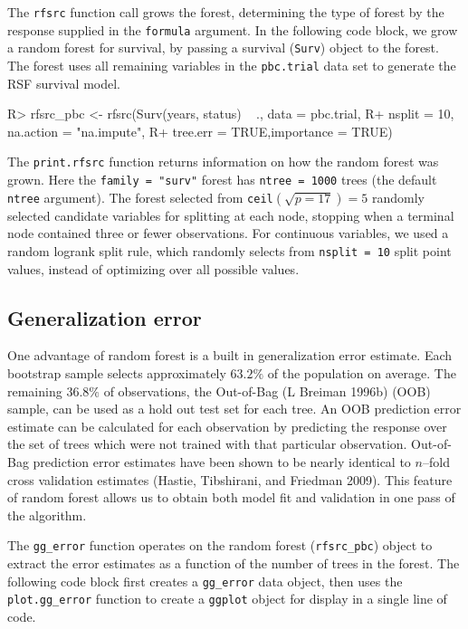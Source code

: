 \documentclass[article, nojss]{jss}
\begin{document}
The  \texttt{rfsrc} function call grows the forest,
determining the type of forest by the response supplied in the
\texttt{formula} argument. In the following code block, we grow a random
forest for survival, by passing a survival (\texttt{Surv}) object to the
forest. The forest uses all remaining variables in the
\texttt{pbc.trial} data set to generate the RSF survival model.

\begin{Schunk}
\begin{Sinput}
R> rfsrc_pbc <- rfsrc(Surv(years, status) ~ ., data = pbc.trial,
R+                    nsplit = 10, na.action = "na.impute",
R+                    tree.err = TRUE,importance = TRUE)
\end{Sinput}
\end{Schunk}

The \texttt{print.rfsrc} function returns information on how the random
forest was grown. Here the \texttt{family\ =\ "surv"} forest has
\texttt{ntree\ =\ 1000} trees (the default \texttt{ntree} argument). The
forest selected from \texttt{ceil}\((\sqrt{p=17}) = 5\) randomly
selected candidate variables for splitting at each node, stopping when a
terminal node contained three or fewer observations. For continuous
variables, we used a random logrank split rule, which randomly selects
from \texttt{nsplit\ =\ 10} split point values, instead of optimizing
over all possible values.

\subsection{Generalization error}\label{generalization-error}

One advantage of random forest is a built in generalization error
estimate. Each bootstrap sample selects approximately \(63.2\%\) of the
population on average. The remaining \(36.8\%\) of observations, the
Out-of-Bag (L Breiman 1996b) (OOB) sample, can be used as a hold out
test set for each tree. An OOB prediction error estimate can be
calculated for each observation by predicting the response over the set
of trees which were not trained with that particular observation.
Out-of-Bag prediction error estimates have been shown to be nearly
identical to \(n\)--fold cross validation estimates (Hastie, Tibshirani,
and Friedman 2009). This feature of random forest allows us to obtain
both model fit and validation in one pass of the algorithm.

The \texttt{gg\_error} function operates on the random forest
(\texttt{rfsrc\_pbc}) object to extract the error estimates as a
function of the number of trees in the forest. The following code block
first creates a \texttt{gg\_error} data object, then uses the
\texttt{plot.gg\_error} function to create a \texttt{ggplot} object for
display in a single line of code.
\end{document}
